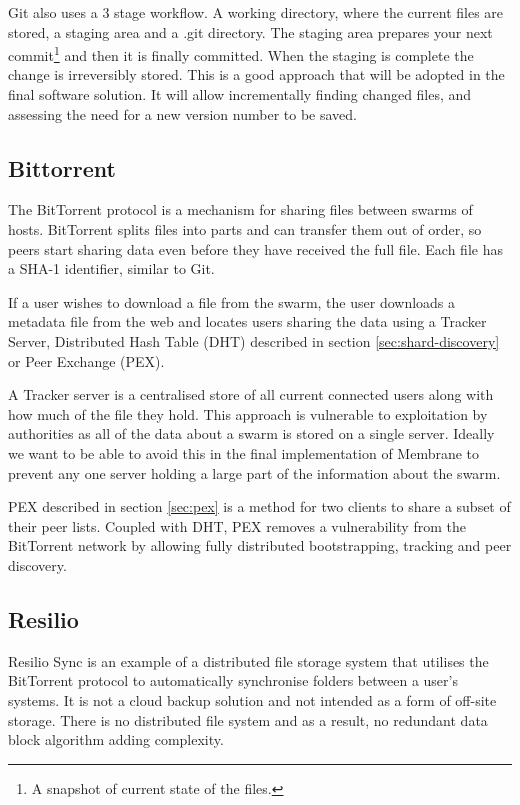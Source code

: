 \documentclass[11pt, a4paper, twoside]{report}
\begin{document}
Git also uses a 3 stage workflow. A working directory, where the current files are stored, a staging area and a .git directory. The staging area prepares your next commit\footnote{A snapshot of current state of the files.} and then it is finally committed. When the staging is complete the change is irreversibly stored. This is a good approach that will be adopted in the final software solution. It will allow incrementally finding changed files, and assessing the need for a new version number to be saved.

\subsection{Bittorrent}

The BitTorrent protocol is a mechanism for sharing files between swarms of hosts. BitTorrent splits files into parts and can transfer them out of order, so peers start sharing data even before they have received the full file. Each file has a SHA-1 identifier, similar to Git. \citep{qiu2004modeling}

If a user wishes to download a file from the swarm, the user downloads a metadata file from the web and locates users sharing the data using a Tracker Server, Distributed Hash Table (DHT) described in section \ref{sec:shard-discovery} or Peer Exchange (PEX). \citep{cohen2008bittorrent}

A Tracker server is a centralised store of all current connected users along with how much of the file they hold. This approach is vulnerable to exploitation by authorities as all of the data about a swarm is stored on a single server. Ideally we want to be able to avoid this in the final implementation of Membrane to prevent any one server holding a large part of the information about the swarm.

PEX described in section \ref{sec:pex} is a method for two clients to share a subset of their peer lists. Coupled with DHT, PEX removes a vulnerability from the BitTorrent network by allowing fully distributed bootstrapping, tracking and peer discovery.

\subsection{Resilio}

Resilio Sync is an example of a distributed file storage system that utilises the BitTorrent protocol to automatically synchronise folders between a user’s systems. It is not a cloud backup solution and not intended as a form of off-site storage. There is no distributed file system and as a result, no redundant data block algorithm adding complexity. \citep{farina2014bittorrent}
\end{document}
